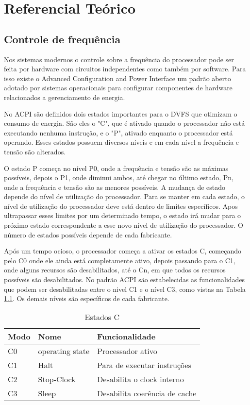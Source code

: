 \chapter{Referencial Teórico} \label{cap:referencial_teorico}

\section{Controle de frequência} \label{sec:controle_freq}

Nos sistemas modernos o controle sobre a frequência do processador pode ser feita por hardware com circuitos independentes como também por software. Para isso existe o Advanced Configuration and Power Interface  um padrão aberto adotado por sistemas operacionais para configurar componentes de hardware relacionados a gerenciamento de energia.

No ACPI são definidos dois estados importantes para o DVFS que otimizam o consumo de energia. São eles o "C", que é ativado quando o processador não está executando nenhuma instrução, e o "P", ativado enquanto o processador está operando. Esses estados possuem diversos níveis e em cada nível a frequência e tensão são alterados.

O estado P começa no nível P0, onde a frequência e tensão são as máximas possíveis, depois o P1, onde diminui ambos, até chegar no último estado, Pn, onde a frequência e tensão são as menores possíveis. A mudança de estado depende do nível de utilização do processador. Para se manter em cada estado, o nível de utilização do processador deve está dentro de limites específicos. Apos ultrapassar esses limites por um determinado tempo, o estado irá mudar para o próximo estado correspondente a esse novo nível de utilização do processador. O número de estados possíveis depende de cada fabricante.

Após um tempo ocioso, o processador começa a ativar os estados C, começando pelo C0 onde ele ainda está completamente ativo, depois passando para o C1, onde alguns recursos são desabilitados, até o Cn, em que todos os recursos possíveis são desabilitados. No padrão ACPI são estabelecidas as funcionalidades que podem ser desabilitadas entre o nivel C1 e o nível C3, como vistas na Tabela \ref{tab:estados_c}. Os demais níveis são específicos de cada fabricante. 

\begin{table}[H]
	\centering
	\begin{tabular}{|l|l|l|}
		\hline
		Modo & Nome            & Funcionalidade                \\ \hline
		C0   & operating state & Processador ativo             \\ \hline
		C1   & Halt            & Para de executar instruções   \\ \hline
		C2   & Stop-Clock      & Desabilita o clock interno    \\ \hline
		C3   & Sleep           & Desabilita coerência de cache \\ \hline
	\end{tabular}
	\caption{Estados C}
	\label{tab:estados_c}
\end{table}

